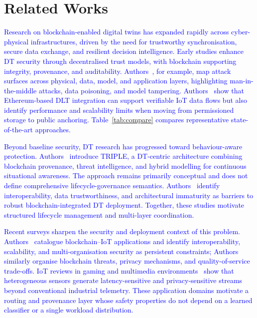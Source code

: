 \documentclass[final,5p,times,twocolumn]{elsarticle}
\begin{document}
\section{\textbf{Related Works}}
\label{sec:review}
\textcolor{blue}{Research on blockchain-enabled digital twins has expanded rapidly across cyber-physical infrastructures, driven by the need for trustworthy synchronisation, secure data exchange, and resilient decision intelligence. Early studies enhance DT security through decentralised trust models, with blockchain supporting integrity, provenance, and auditability. Authors~\cite{suleiman2025blockchain}, for example, map attack surfaces across physical, data, model, and application layers, highlighting man-in-the-middle attacks, data poisoning, and model tampering. Authors~\cite{cunat2024blockchain} show that Ethereum-based DLT integration can support verifiable IoT data flows but also identify performance and scalability limits when moving from permissioned storage to public anchoring. Table~\ref{tab:compare} compares representative state-of-the-art approaches.}

\textcolor{blue}{Beyond baseline security, DT research has progressed toward behaviour-aware protection. Authors~\cite{suhail2024triple} introduce TRIPLE, a DT-centric architecture combining blockchain provenance, threat intelligence, and hybrid modelling for continuous situational awareness. The approach remains primarily conceptual and does not define comprehensive lifecycle-governance semantics. Authors~\cite{li2023digital} identify interoperability, data trustworthiness, and architectural immaturity as barriers to robust blockchain-integrated DT deployment. Together, these studies motivate structured lifecycle management and multi-layer coordination.}

\textcolor{blue}{Recent surveys sharpen the security and deployment context of this problem. Authors~\cite{laghari2023blockchainiot} catalogue blockchain--IoT applications and identify interoperability, scalability, and multi-organisation security as persistent constraints; Authors~\cite{laghari2026blockchainsecurity} similarly organise blockchain threats, privacy mechanisms, and quality-of-service trade-offs. IoT reviews in gaming and multimedia environments~\cite{laghari2025gaming,laghari2025iomt} show that heterogeneous sensors generate latency-sensitive and privacy-sensitive streams beyond conventional industrial telemetry. These application domains motivate a routing and provenance layer whose safety properties do not depend on a learned classifier or a single workload distribution.}
\end{document}
